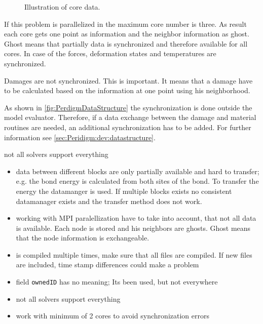 \begin{figure}[htbp]
\centering

\par
\caption{Illustration of core data.}
\label{fig:dev:program:structure:parallelization}
\end{figure}

If this problem is parallelized in \toolname{} the maximum core number is three. As result each core gets one point as information and the neighbor information as ghost. Ghost means that partially data is synchronized and therefore available for all cores. In case of \toolname{} the forces, deformation states and temperatures are synchronized.

Damages are not synchronized. This is important. It means that a damage have to be calculated based on the information at one point using his neighborhood. 

As shown in \autoref{fig:PerdigmDataStructure} the synchronization is done outside the model evaluator. Therefore, if a data exchange between the damage and material routines are needed, an additional synchronization has to be added. For further information see \autoref{sec:Peridigm:dev:datastructure}.


not all solvers support everything


\begin{itemize}
  \item data between different blocks are only partially available and hard to transfer; e.g. the bond energy is calculated from both sites of the bond. To transfer the energy the datamanger is used. If multiple blocks exists no consistent datamanager exists and the transfer method does not work.
  \item working with MPI paralellization have to take into account, that not all data is available. Each node is stored and his neighbors are ghosts. Ghost means that the node information is exchangeable.
  \item \toolname is compiled multiple times, make sure that all files are compiled. If new files are included, time stamp differences could make a problem
  \item field \texttt{ownedID} has no meaning; Its been used, but not everywhere
  \item not all solvers support everything
  \item work with minimum of 2 cores to avoid synchronization errors
\end{itemize}

